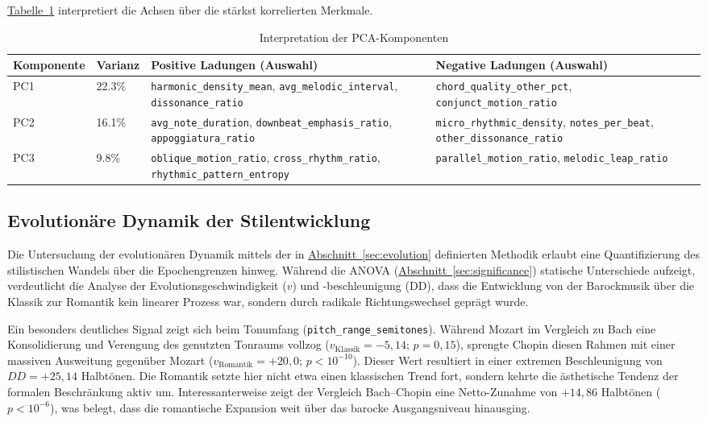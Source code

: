 \documentclass[10pt,a4paper]{article}
\theoremstyle{definition}
\begin{document}
\hyperref[tab:loadings]{Tabelle~\ref*{tab:loadings}} interpretiert die Achsen über die stärkst korrelierten Merkmale.

\begin{table}[htbp]
    \centering
    \caption{Interpretation der PCA-Komponenten}\label{tab:loadings}
    \begin{tabular}{p{2.5cm}p{2.5cm}p{5cm}p{5cm}}
                \toprule
        \textbf{Komponente} & \textbf{Varianz} & \textbf{Positive Ladungen (Auswahl)} & \textbf{Negative Ladungen (Auswahl)} \\
        \midrule
        PC1 & 22.3\% & \texttt{harmonic\_density\_mean}, \texttt{avg\_melodic\_interval}, \texttt{dissonance\_ratio} & \texttt{chord\_quality\_other\_pct}, \texttt{conjunct\_motion\_ratio} \\
        PC2 & 16.1\% & \texttt{avg\_note\_duration}, \texttt{downbeat\_emphasis\_ratio}, \texttt{appoggiatura\_ratio} & \texttt{micro\_rhythmic\_density}, \texttt{notes\_per\_beat}, \texttt{other\_dissonance\_ratio} \\
        PC3 & 9.8\% & \texttt{oblique\_motion\_ratio}, \texttt{cross\_rhythm\_ratio}, \texttt{rhythmic\_pattern\_entropy} & \texttt{parallel\_motion\_ratio}, \texttt{melodic\_leap\_ratio} \\
        \bottomrule
    \end{tabular}
\end{table}

\subsection{Evolutionäre Dynamik der Stilentwicklung}\label{sec:dynamics}
Die Untersuchung der evolutionären Dynamik mittels der in \hyperref[sec:evolution]{Abschnitt~\ref*{sec:evolution}} definierten Methodik erlaubt eine Quantifizierung des stilistischen Wandels über die Epochengrenzen hinweg. Während die ANOVA (\hyperref[sec:significance]{Abschnitt~\ref*{sec:significance}}) statische Unterschiede aufzeigt, verdeutlicht die Analyse der Evolutionsgeschwindigkeit ($v$) und -beschleunigung (DD), dass die Entwicklung von der Barockmusik über die Klassik zur Romantik kein linearer Prozess war, sondern durch radikale Richtungswechsel geprägt wurde.

Ein besonders deutliches Signal zeigt sich beim Tonumfang (\texttt{pitch\_range\_semitones}). Während Mozart im Vergleich zu Bach eine Konsolidierung und Verengung des genutzten Tonraums vollzog ($v_{\text{Klassik}} = -5{,}14$; $p=0{,}15$), sprengte Chopin diesen Rahmen mit einer massiven Ausweitung gegenüber Mozart ($v_{\text{Romantik}} = +20{,}0$; $p<10^{-10}$). Dieser Wert resultiert in einer extremen Beschleunigung von $DD = +25{,}14$ Halbtönen. Die Romantik setzte hier nicht etwa einen klassischen Trend fort, sondern kehrte die ästhetische Tendenz der formalen Beschränkung aktiv um. Interessanterweise zeigt der Vergleich Bach--Chopin eine Netto-Zunahme von $+14{,}86$ Halbtönen ($p<10^{-6}$), was belegt, dass die romantische Expansion weit über das barocke Ausgangsniveau hinausging.
\end{document}
